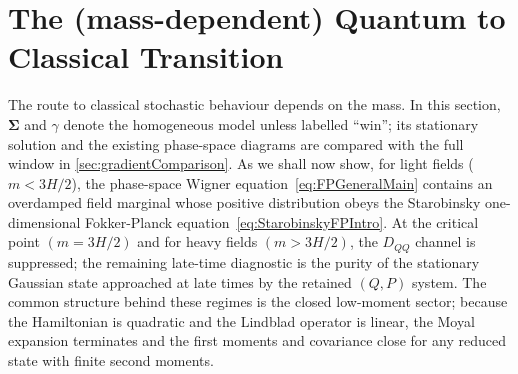 \documentclass{article}
\numberwithin{equation}{section}
\begin{document}
	\section{The (mass-dependent) Quantum to Classical Transition}
	\label{sec:quantum_to_classical}

	The route to classical stochastic behaviour depends on the mass. In this section, $\mathbf\Sigma$ and $\gamma$ denote the homogeneous model unless labelled ``win''; its stationary solution and the existing phase-space diagrams are compared with the full window in \cref{sec:gradientComparison}. As we shall now show, for light fields ($m<3H/2$), the phase-space Wigner equation~\eqref{eq:FPGeneralMain} contains an overdamped field marginal whose positive distribution obeys the Starobinsky one-dimensional Fokker-Planck equation~\eqref{eq:StarobinskyFPIntro}. At the critical point \((m=3H/2)\) and for heavy fields \((m>3H/2)\), the \(D_{QQ}\) channel is suppressed; the remaining late-time diagnostic is the purity of the stationary Gaussian state approached at late times by the retained \((Q,P)\) system. The common structure behind these regimes is the closed low-moment sector; because the Hamiltonian is quadratic and the Lindblad operator is linear, the Moyal expansion terminates and the first moments and covariance close for any reduced state with finite second moments.
\end{document}
